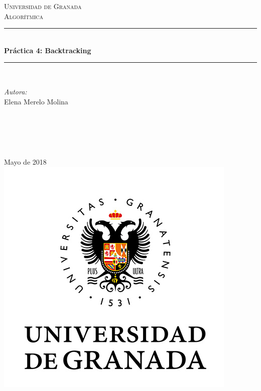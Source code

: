 \documentclass[12pt]{article}
\begin{document}
\begin{titlepage}
\newcommand{\HRule}{\rule{\linewidth}{0.5mm}}
\center
\textsc{\LARGE Universidad de Granada}\\[1.5cm] %
\textsc{\Large Algorítmica}\\[0.5cm] %
\HRule \\[0.4cm]
{ \huge \bfseries Práctica 4: Backtracking}\\[0.4cm] %
\HRule \\[1.5cm]
\begin{minipage}{0.4\textwidth}
\begin{flushleft} \large
\emph{Autora:}\\
Elena Merelo Molina \textsc{} %
\end{flushleft}
\end{minipage}
~
\begin{minipage}{0.4\textwidth}
\begin{flushright} \large
\emph{} \\
\textsc{} %
\end{flushright}
\end{minipage}\\[2cm]
{\large Mayo de 2018}\\[2cm] %
\includegraphics[scale=0.5]{./logo.jpg}
\vfill %
\end{titlepage}
\end{document}
